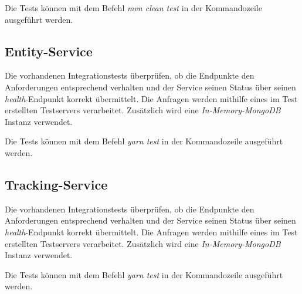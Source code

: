 Die Tests können mit dem Befehl \textit{mvn clean test} in der Kommandozeile ausgeführt werden. 

\subsection{Entity-Service}

Die vorhandenen Integrationstests überprüfen, ob die Endpunkte den Anforderungen entsprechend verhalten und der Service seinen Status über seinen \textit{health}-Endpunkt korrekt übermittelt.
Die Anfragen werden mithilfe eines im Test erstellten Testservers verarbeitet.
Zusätzlich wird eine \textit{In-Memory-MongoDB} Instanz verwendet.

Die Tests können mit dem Befehl \textit{yarn test} in der Kommandozeile ausgeführt werden. 

\subsection{Tracking-Service}

Die vorhandenen Integrationstests überprüfen, ob die Endpunkte den Anforderungen entsprechend verhalten und der Service seinen Status über seinen \textit{health}-Endpunkt korrekt übermittelt.
Die Anfragen werden mithilfe eines im Test erstellten Testservers verarbeitet.
Zusätzlich wird eine \textit{In-Memory-MongoDB} Instanz verwendet.

Die Tests können mit dem Befehl \textit{yarn test} in der Kommandozeile ausgeführt werden.
